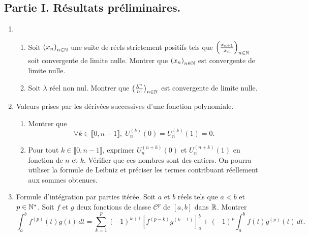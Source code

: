 \subsection*{Partie I. Résultats préliminaires.}
\begin{enumerate}
 \item 
 \begin{enumerate}
  \item Soit $\left( x_n \right)_{n \in \mathbb{N}}$ une suite de réels strictement positifs tels que $\left( \frac{x_{n+1}}{x_n} \right)_{n \in \mathbb{N}}$ soit convergente de limite nulle. Montrer que $\left( x_n \right)_{n \in \mathbb{N}}$ est convergente de limite nulle. 
  \item Soit $\lambda$ réel non nul. Montrer que $\left( \frac{\lambda^n}{n!} \right)_{n \in \mathbb{N}}$ est convergente de limite nulle.
 \end{enumerate}

 \item Valeurs prises par les dérivées successives d'une fonction polynomiale.
\begin{enumerate}
 \item Montrer que
\[
 \forall k \in \llbracket 0, n-1 \rrbracket, \; U_n^{(k)}(0) = U_n^{(k)}(1) = 0.
\]

 \item Pour tout $k\in \llbracket 0, n-1 \rrbracket$, exprimer $U_n^{(n+k)}(0)$ et $U_n^{(n+k)}(1)$ en fonction de $n$ et $k$.
 Vérifier que ces nombres sont des entiers.\newline
 On pourra utiliser la formule de Leibniz et préciser les termes contribuant réellement aux sommes obtenues.
\end{enumerate}

 \item Formule d'intégration par parties itérée.\newline
 Soit $a$ et $b$ réels tels que $a < b$ et $p\in \mathbb{N}^*$. Soit $f$ et $g$ deux fonctions de classe $\mathcal{C}^p$ de $\left[ a,b \right]$ dans $\mathbb{R}$. Montrer 
\[
 \int_a^b f^{(p)}(t) g(t)\,dt 
 = \sum_{k=1}^{p}(-1)^{k+1} \left[ f^{(p-k)} g^{(k-1)}\right]_{a}^{b}
 + (-1)^p\int_a^bf(t) g^{(p)}(t)\,dt .
\]


\end{enumerate}
